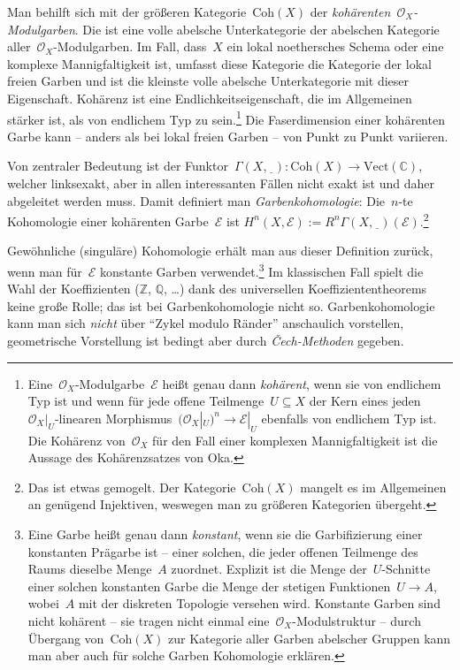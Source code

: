 \documentclass[a4paper,ngerman,12pt]{scrartcl}
\theoremstyle{definition}
\theoremstyle{plain}
\theoremstyle{remark}
\newcommand{\CC}{\mathbb{C}}
\newcommand{\ZZ}{\mathbb{Z}}
\newcommand{\QQ}{\mathbb{Q}}
\newcommand{\E}{\mathcal{E}}
\renewcommand{\O}{\mathcal{O}}
\newcommand{\Vect}{\mathrm{Vect}}
\newcommand{\Coh}{\mathrm{Coh}}
\newcommand{\placeholder}{\underline{\ \ }}
\begin{document}
Man behilft sich mit der größeren Kategorie~$\Coh(X)$ der
\emph{kohärenten~$\O_X$-Modulgarben}. Die ist eine volle abelsche Unterkategorie der
abelschen Kategorie aller~$\O_X$-Modulgarben. Im Fall, dass~$X$ ein
lokal noethersches Schema oder eine komplexe Mannigfaltigkeit ist, umfasst
diese Kategorie die Kategorie der lokal freien Garben und ist die kleinste
volle abelsche Unterkategorie mit dieser Eigenschaft. Kohärenz ist eine
Endlichkeitseigenschaft, die im Allgemeinen stärker ist, als von endlichem Typ
zu sein.\footnote{Eine~$\O_X$-Modulgarbe~$\E$ heißt genau dann \emph{kohärent},
wenn sie von endlichem Typ ist und wenn für jede offene Teilmenge~$U \subseteq
X$ der Kern eines jeden~$\O_X|_U$-linearen Morphismus~$(\O_X|_U)^n \to \E|_U$
ebenfalls von endlichem Typ ist. Die Kohärenz von~$\O_X$ für den Fall einer
komplexen Mannigfaltigkeit ist die Aussage des Kohärenzsatzes von Oka.} Die
Faserdimension einer kohärenten Garbe kann -- anders als bei lokal freien
Garben -- von Punkt zu Punkt variieren.

Von zentraler Bedeutung ist der Funktor~$\Gamma(X,\placeholder) : \Coh(X) \to
\Vect(\CC)$, welcher linksexakt, aber in allen interessanten Fällen nicht
exakt ist und daher abgeleitet werden muss. Damit definiert man
\emph{Garbenkohomologie}: Die~$n$-te Kohomologie einer kohärenten Garbe~$\E$
ist $H^n(X, \E) := R^n \Gamma(X,\placeholder)(\E)$.\footnote{Das ist etwas
gemogelt. Der Kategorie~$\Coh(X)$ mangelt es im Allgemeinen an genügend
Injektiven, weswegen man zu größeren Kategorien übergeht.}

Gewöhnliche (singuläre) Kohomologie erhält man aus dieser Definition zurück,
wenn man für~$\E$ konstante Garben verwendet.\footnote{Eine Garbe heißt genau
dann \emph{konstant}, wenn sie die Garbifizierung einer konstanten Prägarbe ist
-- einer solchen, die jeder offenen Teilmenge des Raums dieselbe Menge~$A$
zuordnet. Explizit ist die Menge der~$U$-Schnitte einer solchen konstanten Garbe
die Menge der stetigen Funktionen~$U \to A$, wobei~$A$ mit der diskreten
Topologie versehen wird. Konstante Garben sind nicht kohärent -- sie tragen
nicht einmal eine~$\O_X$-Modulstruktur -- durch Übergang von~$\Coh(X)$ zur
Kategorie aller Garben abelscher Gruppen kann man aber auch für solche Garben
Kohomologie erklären.} Im klassischen Fall spielt die Wahl der Koeffizienten
($\ZZ$, $\QQ$, \ldots) dank des universellen Koeffiziententheorems keine große
Rolle; das ist bei Garbenkohomologie nicht so. Garbenkohomologie kann man sich
\emph{nicht} über "`Zykel modulo Ränder"' anschaulich vorstellen, geometrische
Vorstellung ist bedingt aber durch \emph{Čech-Methoden} gegeben.
\end{document}
